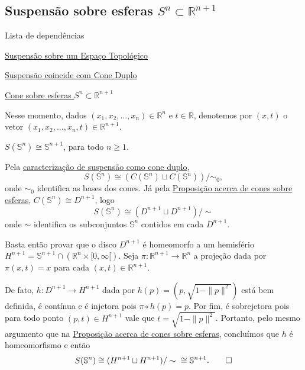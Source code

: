\subsection{Suspensão sobre esferas $S^n\subset\mathbb{R}^{n+1}$}
\label{suspensao-esfera-prop}
\begin{titlemize}{Lista de dependências}
	\item \hyperref[suspensao-def]{Suspensão sobre um Espaço Topológico}
    \item \hyperref[suspensao-cone-duplo-prop]{Suspensão coincide com Cone Duplo}
    \item \hyperref[cone-esfera-prop]{Cone sobre esferas $S^n\subset\mathbb{R}^{n+1}$}
\end{titlemize}

Nesse momento, dados $(x_1,x_2,...,x_n) \in \mathbb{R}^n$ e $t \in \mathbb{R}$, denotemos por $(x,t)$ o vetor $(x_1,x_2,...,x_n,t) \in \mathbb{R}^{n+1}$.

\begin{prop}
	$S(\mathbb{S}^n) \cong \mathbb{S}^{n+1}$, para todo $n\geq 1$.

    \begin{dem}
        Pela \hyperref[suspensao-cone-duplo-prop]{caracterização de suspensão como cone duplo}, \[S(\mathbb{S}^n) \cong (C(\mathbb{S}^n) \sqcup C(\mathbb{S}^n))/\sim_0,\] onde $\sim_0$ identifica as bases dos cones. Já pela \hyperref[cone-esfera-prop]{Proposição acerca de cones sobre esferas}, $C(\mathbb{S}^n) \cong D^{n+1}$, logo \[S(\mathbb{S}^n) \cong (D^{n+1} \sqcup D^{n+1})/\sim\] onde $\sim$ identifica os subconjuntos $\mathbb{S}^n$ contidos em cada $D^{n+1}$.
        
        Basta então provar que o disco $D^{n+1}$ é homeomorfo a um hemisfério $H^{n+1} = \mathbb{S}^{n+1}\cap (\mathbb{R}^n \times [0,\infty[)$. Seja $\pi:\mathbb{R}^{n+1}\to\mathbb{R}^n$ a projeção dada por $\pi(x,t) = x$ para cada $(x,t) \in \mathbb{R}^{n+1}$.
        
        De fato, $h:D^{n+1}\to H^{n+1}$ dada por $h(p)=(p,\sqrt{1-\|p\|^2})$ está bem definida, é contínua e é injetora pois $\pi \circ h(p) = p$. Por fim, é sobrejetora pois para todo ponto $(p,t)\in H^{n+1}$ vale que $t=\sqrt{1-\|p\|^2}$. Portanto, pelo mesmo argumento que na \hyperref[cone-esfera-prop]{Proposição acerca de cones sobre esferas}, concluímos que $h$ é homeomorfismo e então\[S(\mathbb{S}^n) \cong (H^{n+1} \sqcup H^{n+1})/\sim \hspace{6 pt} \cong \mathbb{S}^{n+1}.\qedhere\]
    \end{dem}
\end{prop}

